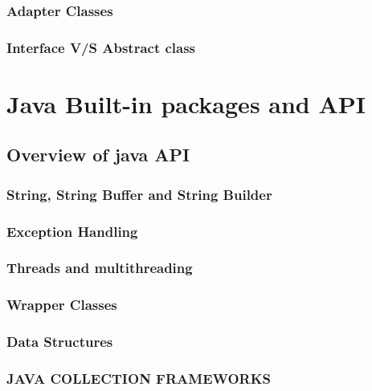 \documentclass[14pt,fleqn]{extbook} %
\begin{document}
\subsection{Adapter Classes}

\subsection{Interface V/S Abstract class}



\chapter{Java Built-in packages and API}
\section{Overview of java API}

\subsection{String, String Buffer and String Builder}

\subsection{Exception Handling}

\subsection{Threads and multithreading}

\subsection{Wrapper Classes}

\subsection{Data Structures}

\subsection{JAVA COLLECTION FRAMEWORKS}

\end{document}
